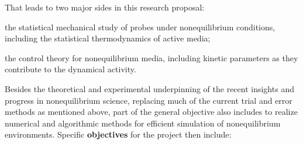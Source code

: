 That leads to two major sides in this research proposal:
\begin{inparaenum}[A.]
\item the statistical mechanical study of probes under nonequilibrium conditions, including
the statistical thermodynamics of active media;
\item the control theory for nonequilibrium media, including kinetic parameters as they
contribute to the dynamical activity.
\end{inparaenum}
Besides the theoretical and experimental underpinning of the recent insights and progress in
nonequilibrium science, replacing much of the current trial and error methods as mentioned
above, part of the general objective also includes to realize numerical and algorithmic
methods for efficient simulation of nonequilibrium environments. Specific {\bf objectives}
for the project then include:
